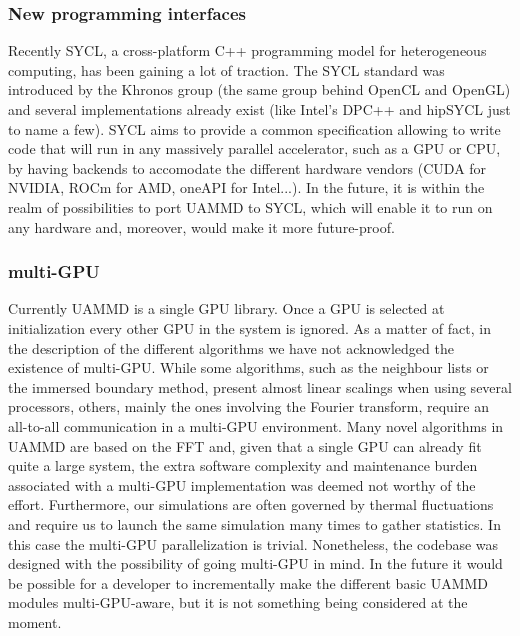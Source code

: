 \documentclass[ twoside,openright,titlepage,numbers=noenddot,%
headinclude,footinclude,cleardoublepage=empty,abstract=on,
BCOR=5mm,paper=b5,fontsize=11pt, dvipsnames
]{scrreprt}
\begin{document}
\subsubsection*{New programming interfaces}
Recently SYCL, a cross-platform C++ programming model for heterogeneous computing, has been gaining a lot of traction. The SYCL standard was introduced by the Khronos group (the same group behind OpenCL and OpenGL) and several implementations already exist (like Intel's DPC++ and hipSYCL just to name a few). SYCL aims to provide a common specification allowing to write code that will run in any massively parallel accelerator, such as a GPU or CPU, by having backends to accomodate the different hardware vendors (CUDA for NVIDIA, ROCm for AMD, oneAPI for Intel...). In the future, it is within the realm of possibilities to port UAMMD to SYCL, which will enable it to run on any hardware and, moreover, would make it more future-proof.

\subsubsection*{multi-GPU}
Currently UAMMD is a single GPU library. Once a GPU is selected at initialization every other GPU in the system is ignored. As a matter of fact, in the description of the different algorithms we have not acknowledged the existence of multi-GPU. While some algorithms, such as the neighbour lists or the immersed boundary method, present almost linear scalings when using several processors, others, mainly the ones involving the Fourier transform, require an all-to-all communication in a multi-GPU environment. Many novel algorithms in UAMMD are based on the \gls{FFT} and, given that a single GPU can already fit quite a large system, the extra software complexity and maintenance burden associated with a multi-GPU implementation was deemed not worthy of the effort. Furthermore, our simulations are often governed by thermal fluctuations and require us to launch the same simulation many times to gather statistics. In this case the multi-GPU parallelization is trivial. Nonetheless, the codebase was designed with the possibility of going multi-GPU in mind. In the future it would be possible for a developer to incrementally make the different basic UAMMD modules multi-GPU-aware, but it is not something being considered at the moment.
\end{document}
